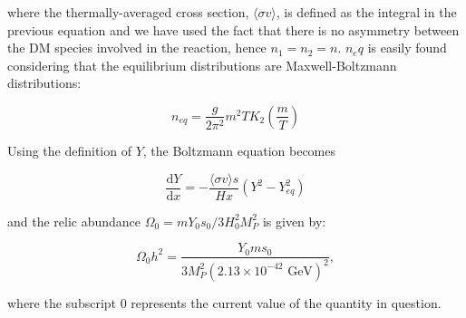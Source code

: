 \documentclass[final,5p,times,twocolumn, nopreprintline]{elsarticle}
\numberwithin{equation}{section}
\begin{document}
where the thermally-averaged cross section, $\langle\sigma v\rangle$, is defined as the integral in the previous equation and we have used the fact that there is no asymmetry between the DM species involved in the reaction, hence $n_1=n_2=n$. $n_eq$ is easily found considering that the equilibrium distributions are Maxwell-Boltzmann distributions:

$$
n_{eq} = \dfrac{g}{2\pi^2}m^2TK_2\left(\dfrac{m}{T}\right)
$$

 Using the definition of $Y$, the Boltzmann equation becomes 

$$
\dfrac{\mathrm{d}Y}{\mathrm{d}x}=-\dfrac{\langle\sigma v\rangle s}{Hx}(Y^2-Y_{eq}^2)
$$

and the relic abundance $\Omega_0=mY_0s_0/3H_0^2M_P^2$ is given by:

$$
\Omega_{0}h^2=\dfrac{Y_0ms_0}{3M_P^2(2.13\times 10^{-42}\text{ GeV})^2},
$$

where the subscript 0 represents the current value of the quantity in question.
 







\end{document}
